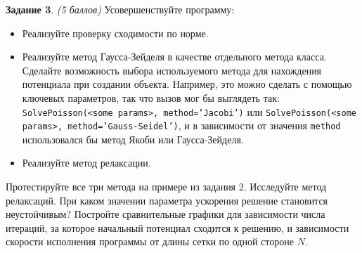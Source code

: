 \documentclass[12pt]{article}
\newcommand{\task}[2]{\vspace{6pt}
\textbf{Задание #1}. #2 \vspace{6pt}}
\begin{document}
\task{3}{\textit{(5 баллов)} Усовершенствуйте программу:
\begin{itemize}
\item Реализуйте проверку сходимости по норме.
\item Реализуйте метод Гаусса-Зейделя в качестве отдельного метода класса. Сделайте возможность выбора используемого метода для нахождения потенциала при создании объекта. Например, это можно сделать с помощью ключевых параметров, так что вызов мог бы выглядеть так: \texttt{SolvePoisson(<some params>, method='Jacobi')} или \texttt{SolvePoisson(<some params>, method='Gauss-Seidel')}, и в зависимости от значения \texttt{method} использовался бы метод Якоби или Гаусса-Зейделя.
\item Реализуйте метод релаксации.
\end{itemize}

Протестируйте все три метода на примере из задания 2. Исследуйте метод релаксаций. При каком значении параметра ускорения решение становится неустойчивым? Постройте сравнительные графики для зависимости числа итераций, за которое начальный потенциал сходится к решению, и зависимости скорости исполнения программы от длины сетки по одной стороне $N$.
}
\end{document}
